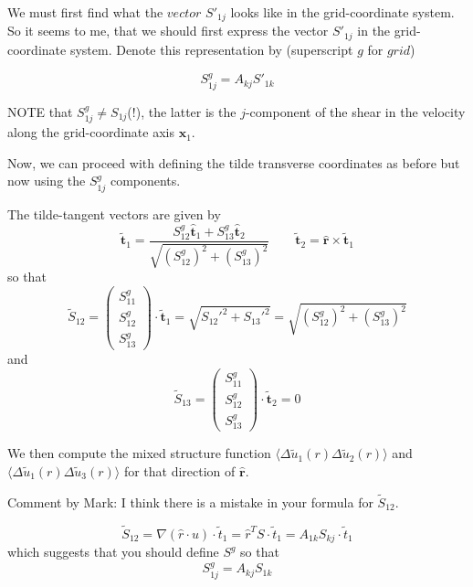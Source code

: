 \documentclass[12pt]{article}
\begin{document}
We must first find what the $vector$ $S'_{1j}$ looks like in the
grid-coordinate system. So it seems to me, that we should first
express the vector $S'_{1j}$ in the grid-coordinate system. Denote
this representation by (superscript $g$ for $grid$)

\begin{equation}S^g_{1j}  =  A_{kj} S'_{1k}\end{equation}

NOTE that $S^g_{1j} \neq S_{1j}$(!), the latter is the $j$-component
of the shear in the velocity along the grid-coordinate axis
$\bm{x}_1$.  

Now, we can proceed with defining the tilde transverse coordinates as before but now using the $S^g_{1j}$ components.
 
The tilde-tangent vectors are given by 
\begin{equation}
\bm{{\tilde t}}_1 = \frac{S^g_{12}  \bm{{\hat t}}_1 +  S^g_{13}  \bm{{\hat t}}_2 }
                         {\sqrt{ (S^g_{12})^2 +  (S^g_{13})^2 }}
\qquad
\bm{{\tilde t}}_2 = \bm{{\hat r}} \times \bm{{\tilde t}}_1
\end{equation}
so that
\begin{equation}
\tilde S_{12} = 
\begin{pmatrix}  S^g_{11} \\
                 S^g_{12} \\
                 S^g_{13} 
\end{pmatrix}
\cdot \bm{{\tilde t}}_1 = 
 \sqrt{ S_{12}'^2 + S_{13}'^2 } =  \sqrt{ (S^g_{12})^2 + (S^g_{13})^2 }
\end{equation}
and 
\begin{equation}
\tilde S_{13} = 
\begin{pmatrix}  S^g_{11} \\
                 S^g_{12} \\
                 S^g_{13} 
\end{pmatrix}
\cdot \bm{{\tilde t}}_2 =  0
\end{equation}


We then compute the mixed structure function $\langle \Delta \tilde u_1 (r) 
\Delta \tilde u_2 (r)\rangle$ and 
$\langle \Delta \tilde u_1 (r) \Delta \tilde u_3 (r)\rangle$ for that direction of $\bm{{\hat r}}$.


Comment by Mark:
  I think there is a mistake in your formula for $\tilde S_{12}$.

\begin{equation}
{\tilde S}_{12} = \nabla (\hat r \cdot u) \cdot {\tilde t}_1
= \hat r^T  S \cdot {\tilde t}_1 
= A_{1k} S_{kj} \cdot {\tilde t}_1 
\end{equation}
which suggests that you should define $S^g$ so that
\begin{equation}S^g_{1j}  =  A_{kj} S_{1k}\end{equation}
\end{document}
